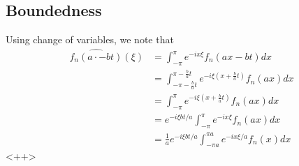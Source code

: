 \documentclass[12pt,reqno]{amsart}
\numberwithin{equation}{section}  %
\newcommand{\zz}{\mathbb{Z}}
\newcommand{\wh}{\widehat}
\begin{document}
\subsection{Boundedness}
%
%
Using change of variables, we note that 
%
%
\begin{equation*}
\begin{split}
  \wh{f_{n}(a \cdot - b t)}(\xi)
  & = \int_{-\pi}^{\pi} e^{-ix \xi} f_{n}(ax - bt)dx
  \\
  & = \int_{-\pi - \frac{b}{a}t}^{\pi - \frac{b}{a}t} e^{-i \xi(x +
  \frac{b}{a}t)} f_{n}(ax) dx
  \\
  & = \int_{-\pi}^{\pi } e^{-i \xi(x +
  \frac{b}{a}t)} f_{n}(ax) dx
  \\
  & = e^{-i\xi bt/a} \int_{-\pi}^{\pi} e^{-ix \xi} f_{n}(ax) dx
  \\
  & = \frac{1}{a} e^{-i \xi bt/a} \int_{-\pi a}^{\pi a} e^{-ix
  \xi /a}f_{n}(x) dx
\end{split}
\end{equation*}
%
%
%
%
%
%
<++>
\end{document}
